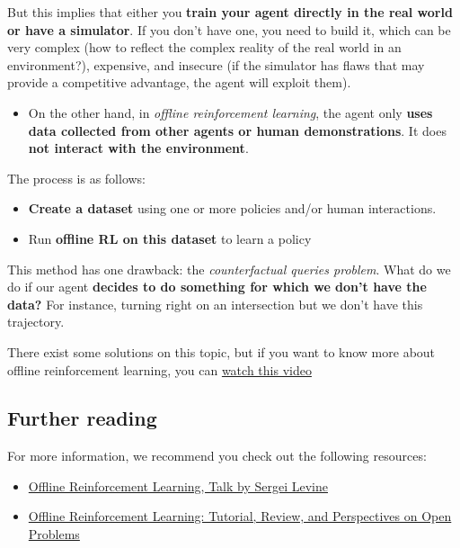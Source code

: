 \documentclass[11pt,a4paper]{article}
\begin{document}
But this implies that either you \textbf{train your agent directly in the real world or have a simulator}. If you don't have one, you need to build it, which can be very complex (how to reflect the complex reality of the real world in an environment?), expensive, and insecure (if the simulator has flaws that may provide a competitive advantage, the agent will exploit them).

\begin{itemize}
\tightlist
\item
  On the other hand, in \emph{offline reinforcement learning}, the agent only \textbf{uses data collected from other agents or human demonstrations}. It does \textbf{not interact with the environment}.
\end{itemize}

The process is as follows:

\begin{itemize}
\item
  \textbf{Create a dataset} using one or more policies and/or human interactions.
\item
  Run \textbf{offline RL on this dataset} to learn a policy
\end{itemize}

This method has one drawback: the \emph{counterfactual queries problem}. What do we do if our agent \textbf{decides to do something for which we don't have the data?} For instance, turning right on an intersection but we don't have this trajectory.

There exist some solutions on this topic, but if you want to know more about offline reinforcement learning, you can \href{https://www.youtube.com/watch?v=k08N5a0gG0A}{watch this video}

\subsection{Further reading}\label{further-reading-2}

For more information, we recommend you check out the following resources:

\begin{itemize}
\item
  \href{https://www.youtube.com/watch?v=qgZPZREor5I}{Offline Reinforcement Learning, Talk by Sergei Levine}
\item
  \href{https://arxiv.org/abs/2005.01643}{Offline Reinforcement Learning: Tutorial, Review, and Perspectives on Open Problems}
\end{itemize}
\end{document}
